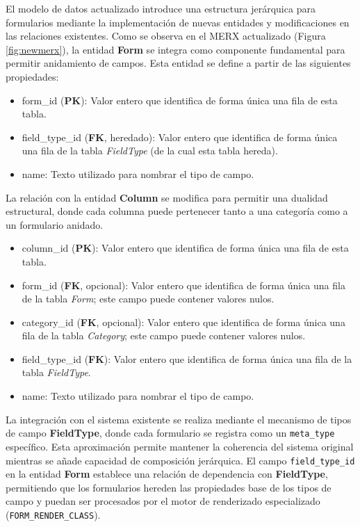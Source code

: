 \documentclass[12pt, a4paper]{book}
\begin{document}
El modelo de datos actualizado introduce una estructura jerárquica para formularios mediante la implementación de nuevas entidades y modificaciones en las relaciones existentes. Como se observa en el MERX actualizado (Figura \ref{fig:newmerx}), la entidad \textbf{Form} se integra como componente fundamental para permitir anidamiento de campos. Esta entidad se define a partir de las siguientes propiedades:

\begin{itemize}
  \item form\_id (\textbf{PK}): Valor entero que identifica de forma única una fila de esta tabla.
  \item field\_type\_id (\textbf{FK}, heredado): Valor entero que identifica de forma única una fila de la tabla \textit{FieldType} (de la cual esta tabla hereda). 
  \item name: Texto utilizado para nombrar el tipo de campo.
\end{itemize}

La relación con la entidad \textbf{Column} se modifica para permitir una dualidad estructural, donde cada columna puede pertenecer tanto a una categoría como a un formulario anidado.

\begin{itemize}
  \item column\_id (\textbf{PK}): Valor entero que identifica de forma única una fila de esta tabla.
  \item form\_id (\textbf{FK}, opcional): Valor entero que identifica de forma única una fila de la tabla \textit{Form}; este campo puede contener valores nulos.
  \item category\_id (\textbf{FK}, opcional): Valor entero que identifica de forma única una fila de la tabla \textit{Category}; este campo puede contener valores nulos.
  \item  field\_type\_id (\textbf{FK}): Valor entero que identifica de forma única una fila de la tabla \textit{FieldType}.
  \item name: Texto utilizado para nombrar el tipo de campo.
\end{itemize}

La integración con el sistema existente se realiza mediante el mecanismo de tipos de campo \textbf{FieldType}, donde cada formulario se registra como un \texttt{meta\_type} específico. Esta aproximación permite mantener la coherencia del sistema original mientras se añade capacidad de composición jerárquica. El campo \texttt{field\_type\_id} en la entidad \textbf{Form} establece una relación de dependencia con \textbf{FieldType}, permitiendo que los formularios hereden las propiedades base de los tipos de campo y puedan ser procesados por el motor de renderizado especializado (\texttt{FORM\_RENDER\_CLASS}).
\end{document}
